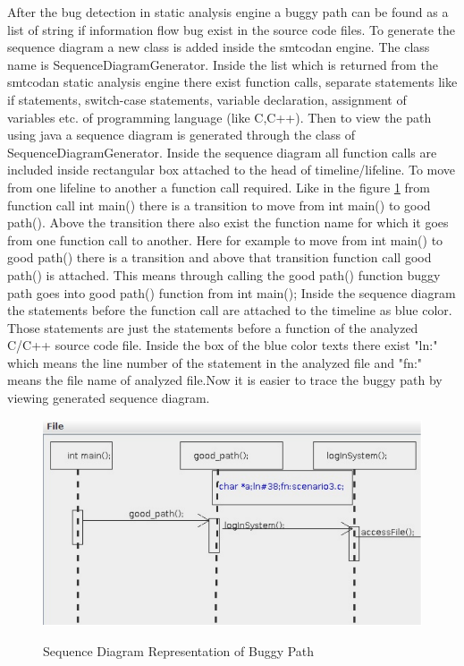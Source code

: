 After the bug detection in static analysis engine a buggy path can be found as a list of string if information flow bug exist in the source code files. To generate the sequence diagram a new class is added inside the smtcodan engine. The class name is SequenceDiagramGenerator. Inside the list which is returned from the smtcodan static analysis engine there
exist function calls, separate statements like if statements, switch-case statements, variable declaration, assignment of variables etc. of programming language (like C,C++). Then to view the path using java
a sequence diagram is generated through the class of SequenceDiagramGenerator.  Inside the sequence diagram all function calls are included inside rectangular box attached to the head of timeline/lifeline. To move from one lifeline to another a function call
required. Like in the figure \ref{viewSequenceDiagram} from function call int main() there is a transition to move from int
main() to good path(). Above the transition there also exist the function name for which it goes from one function call to another. Here for example to move from int main() to good path() there is a transition and above that transition function call good path() is attached. This means through calling the good path() function buggy path goes into good path() function from int main(); Inside
the sequence diagram the statements before the function call are attached to the timeline as blue color. Those statements are just the statements before a function of the analyzed C/C++ source code file. Inside the box of the blue color texts there exist "ln:" which means the line number of the statement in the analyzed file and "fn:" means the file name of analyzed file.Now it is easier to trace the buggy path by viewing generated sequence diagram.

\begin{figure}[htbp]
	\centering
	\includegraphics{styles/viewSequenceDiagram.pdf}
	\label{viewSequenceDiagram}
	\caption{Sequence Diagram Representation of Buggy Path}
\end{figure}
